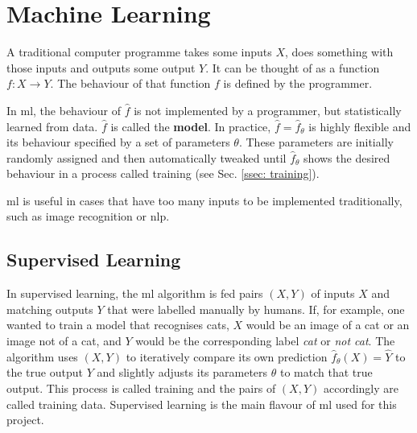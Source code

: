 \section{Machine Learning \label{sec: ML}}
    A traditional computer programme takes some inputs $X$, does something with those inputs and outputs some output $Y$. It can be thought of as a function $f: X \rightarrow Y$. The behaviour of that function $f$ is defined by the programmer.

    In \gls{ml}, the behaviour of $\hat{f}$ is not implemented by a programmer, but statistically learned from data. $\hat{f}$ is called the \textbf{\gls{model}}. In practice, $\hat{f} = \hat{f}_\theta$ is highly flexible and its behaviour specified by a set of parameters $\theta$. These parameters are initially randomly assigned and then automatically tweaked until $\hat{f}_\theta$ shows the desired behaviour in a process called training (see Sec. \ref{ssec: training}).

    \gls{ml} is useful in cases that have too many inputs to be implemented traditionally, such as image recognition or \gls{nlp}.

    \subsection{Supervised Learning}
        In supervised learning, the \gls{ml} algorithm is fed pairs $(X, Y)$ of inputs $X$ and matching outputs $Y$ that were labelled manually by humans. If, for example, one wanted to train a \gls{model} that recognises cats, $X$ would be an image of a cat or an image not of a cat, and $Y$ would be the corresponding label \textit{cat} or \textit{not cat}. The algorithm uses $(X, Y)$ to iteratively compare its own prediction $\hat{f}_\theta(X) = \hat{Y}$ to the true output $Y$ and slightly adjusts its parameters $\theta$ to match that true output. This process is called training and the pairs of $(X, Y)$ accordingly are called training data. %
        Supervised learning is the main flavour of \gls{ml} used for this project.


